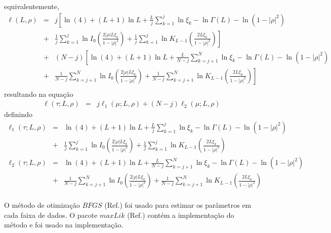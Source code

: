 \documentclass[remotesensing,article,submit,moreauthors,pdftex]{Definitions/mdpi}
\begin{document}
equivalentemente,
\begin{equation}\nonumber
\begin{array}{lll}
   \ell(L, \rho)&=&j\left[\ln (4)+(L+1)\ln L+\frac{L}{j}\sum_{k=1}^{j}\ln \xi_k-\ln\Gamma(L)-\ln(1-|\rho|^2)\right.\\
   &+&\left.\frac{1}{j}\sum_{k=1}^{j}\ln I_0\left(\frac{2|\rho|L\xi_k}{1-|\rho|^2}\right)+ \frac{1}{j}\sum_{k=1}^{j}\ln K_{L-1}\left(\frac{2L\xi_k}{1-|\rho|^2}\right)\right]\\
              &+&(N-j)\left[\ln (4)+(L+1)\ln L+\frac{L}{N-j}\sum_{k=j+1}^{N}\ln \xi_k-\ln\Gamma(L)-\ln(1-|\rho|^2)\right.\\
              &+&\left.\frac{1}{N-j}\sum_{k=j+1}^{N}\ln I_0\left(\frac{2|\rho|L\xi_k}{1-|\rho|^2}\right)+ \frac{1}{N-j}\sum_{k=j+1}^{N}\ln K_{L-1}\left(\frac{2L\xi_k}{1-|\rho|^2}\right)\right]\\ 
 \end{array}
 \end{equation}
resultando na equação
\begin{equation}\nonumber
\begin{array}{ccc}  
  \ell(\tau; L, \rho)&=&j\ell_1(\mu; L, \rho) + (N - j)\ell_2(\mu; L, \rho)
 \end{array}
 \end{equation}
definindo
 \begin{equation}
\begin{array}{ccc}\label{func_l_param_L_rho_razao}
    \ell_1(\tau; L, \rho)&=&\ln (4)+(L+1)\ln L+\frac{L}{j}\sum_{k=1}^{j}\ln \xi_k-\ln\Gamma(L)-\ln(1-|\rho|^2)\\
   &+&\frac{1}{j}\sum_{k=1}^{j}\ln I_0\left(\frac{2|\rho|L\xi_k}{1-|\rho|^2}\right)+ \frac{1}{j}\sum_{k=1}^{j}\ln K_{L-1}\left(\frac{2L\xi_k}{1-|\rho|^2}\right)\\
    \ell_2(\tau; L, \rho)&=&\ln (4)+(L+1)\ln L+\frac{L}{N-j}\sum_{k=j+1}^{N}\ln \xi_k-\ln\Gamma(L)-\ln(1-|\rho|^2)\\
              &+&\frac{1}{N-j}\sum_{k=j+1}^{N}\ln I_0\left(\frac{2|\rho|L\xi_k}{1-|\rho|^2}\right)+ \frac{1}{N-j}\sum_{k=j+1}^{N}\ln K_{L-1}\left(\frac{2L\xi_k}{1-|\rho|^2}\right)\\
 \end{array}
 \end{equation}

O método de otimização $BFGS$ (Ref.\cite{nw_2006}) foi usado para estimar os parâmetros em cada faixa de dados. O pacote $maxLik$ (Ref.\cite{ht_2011}) contém a implementação do método e foi usado na implementação.
 
\end{document}
